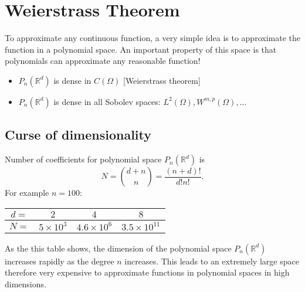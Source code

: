 
\section{Weierstrass Theorem}  
To approximate any continuous function, a very simple idea is to approximate the function in a polynomial space. 
An important property of this space is that polynomials can approximate any reasonable function!
\begin{itemize}
\item $P_n(\mathbb{R}^d)$ is dense in $C(\Omega)$ [Weierstrass theorem]
\item $P_n(\mathbb{R}^d)$ is dense in all Sobolev spaces: $L^2(\Omega), W^{m,p}(\Omega), \ldots$
\end{itemize}


 
\subsection{Curse of dimensionality}
Number of coefficients for polynomial space $P_n(\mathbb{R}^d)$  is
$$
	N = \binom{d+n}{n} = \frac{(n+d)!}{d!n!}.
$$
For example $n = 100$:
		\begin{table}
			\centering
			\begin{tabular}{|c|c|c|c|}
				\hline
				$d = $&  $2$ &  $4$ & $8$\\
				\hline
				$N=$  & $5\times10^3$ & $4.6\times10^6$  & $3.5\times10^{11}$ 	\\
				\hline
			\end{tabular}
		\end{table}
As the this table shows, the dimension of the polynomial space $P_n(\mathbb{R}^d)$   increases rapidly as the degree $n$ increases. This leads to an extremely large space therefore very expensive to approximate functions in polynomial spaces in high dimensions.



